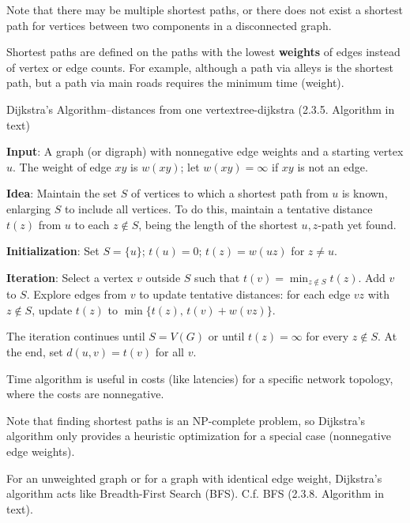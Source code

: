 \documentclass[../src/handouts/main.tex]{subfiles}
\begin{document}
Note that there may be multiple shortest paths, or there does not exist a shortest path for vertices between two components in a disconnected graph.

Shortest paths are defined on the paths with the lowest \textbf{weights} of edges instead of vertex or edge counts. For example, although a path via alleys is the shortest path, but a path via main roads requires the minimum time (weight).

\begin{algorithm}{Dijkstra's Algorithm--distances from one vertex}{tree-dijkstra}
  (2.3.5. Algorithm in text)

  \textbf{Input}: A graph (or digraph) with nonnegative edge weights and a starting vertex $u$. The weight of edge $x y$ is $w(x y)$; let $w(x y)=\infty$ if $x y$ is not an edge.

  \textbf{Idea}: Maintain the set $S$ of vertices to which a shortest path from $u$ is known, enlarging $S$ to include all vertices. To do this, maintain a tentative distance $t(z)$ from $u$ to each $z \notin S$, being the length of the shortest $u, z$-path yet found.

  \textbf{Initialization}: Set $S = \{ u \}$; $t(u) = 0$; $t(z) = w(u z)$ for $z \neq u$.

  \textbf{Iteration}: Select a vertex $v$ outside $S$ such that $t(v) = \min _{z \notin S} t(z)$. Add $v$ to $S$. Explore edges from $v$ to update tentative distances: for each edge $v z$ with $z \notin S$, update $t(z)$ to $\min \{ t(z),\, t(v) + w(v z)\}$.

  The iteration continues until $S = V(G)$ or until $t(z) = \infty$ for every $z \notin S$. At the end, set $d(u, v) = t(v)$ for all $v$.
\end{algorithm}

Time algorithm is useful in costs (like latencies) for a specific network topology, where the costs are nonnegative.

Note that finding shortest paths is an NP-complete problem, so Dijkstra's algorithm only provides a heuristic optimization for a special case (nonnegative edge weights).

For an unweighted graph or for a graph with identical edge weight, Dijkstra's algorithm acts like Breadth-First Search (BFS). C.f. BFS (2.3.8. Algorithm in text).
\end{document}
